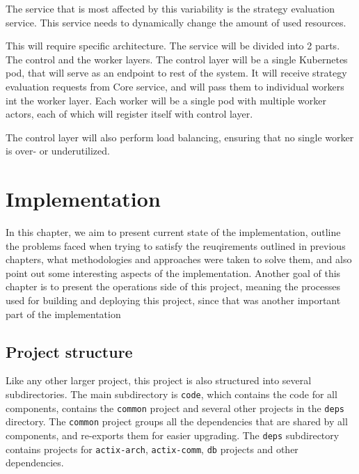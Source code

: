 The service that is most affected by this variability is the strategy evaluation service. This service needs to
dynamically change the amount of used resources.

This will require specific architecture. The service will be divided into 2 parts. The control and the worker layers.
The control layer will be a single Kubernetes pod, that will serve as an endpoint to rest of the system. It will receive
strategy evaluation requests from Core service, and will pass them to individual workers int the worker layer.
Each worker will be a single pod with multiple worker actors, each of which will register itself with control layer.

The control layer will also perform load balancing, ensuring that no single worker is over- or underutilized.




\chapter{Implementation}

In this chapter, we aim to present current state of the implementation, outline the problems faced when trying to satisfy the
reuqirements outlined in previous chapters, what methodologies and approaches were taken to solve them, and also
point out some interesting aspects of the implementation. Another goal of this chapter is to present the operations
side of this project, meaning the processes used for building and deploying this project, since that was another
important part of the implementation

\section{Project structure}
Like any other larger project, this project is also structured into several subdirectories. The main subdirectory is \verb|code|,
which contains the code for all components, contains the \verb|common| project and several other
projects in the \verb|deps| directory. The \verb|common| project groups all the dependencies that
are shared by all components, and re-exports them for easier upgrading. The \verb|deps| subdirectory contains
projects for \verb|actix-arch|, \verb|actix-comm|, \verb|db| projects and other dependencies.


